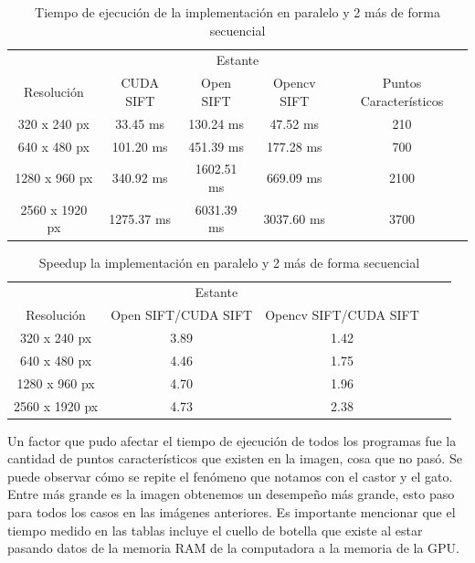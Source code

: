 \begin{table}[phtb]
\centering
\begin{tabular}{|c|c|c|c|c|}
\hline
\multicolumn{5}{|c|}{Estante} \\
\cline{1-5}
Resolución & CUDA SIFT & Open SIFT & Opencv SIFT & Puntos Característicos\\
\hline \hline
 320 x 240 px  & 33.45 ms   & 130.24 ms   & 47.52 ms   & 210\\ \cline{1-5}
 640 x 480 px  & 101.20 ms  &  451.39 ms  & 177.28 ms  & 700\\ \cline{1-5}
1280 x 960 px  & 340.92 ms  &  1602.51 ms & 669.09 ms  & 2100\\ \cline{1-5}
2560 x 1920 px & 1275.37 ms &  6031.39 ms & 3037.60 ms & 3700\\ \cline{1-5}
\end{tabular}
\caption{Tiempo de ejecución de la implementación en paralelo y 2 más de forma secuencial}
\label{tabla:final}
\end{table}
\begin{table}[phtb]
\centering
\begin{tabular}{|c|c|c|c|c|}
\hline
\multicolumn{3}{|c|}{Estante} \\
\cline{1-3}
Resolución & Open SIFT/CUDA SIFT & Opencv SIFT/CUDA SIFT \\
\hline \hline
 320 x 240 px  &  3.89  &  1.42   \\ \cline{1-3}
 640 x 480 px  &  4.46  &  1.75  \\ \cline{1-3}
1280 x 960 px  &  4.70  &  1.96  \\ \cline{1-3}
2560 x 1920 px &  4.73  &  2.38 \\ \cline{1-3}
\end{tabular}
\caption{Speedup la implementación en paralelo y 2 más de forma secuencial}
\label{tabla:final}
\end{table}
\pagebreak
Un factor que pudo afectar el tiempo de ejecución de todos los programas fue la cantidad de puntos característicos que existen en la imagen, cosa que no pasó. Se puede observar cómo se repite el fenómeno que notamos con el castor y el gato. Entre más grande es la imagen obtenemos un desempeño más grande, esto paso para todos los casos en las imágenes anteriores. Es importante mencionar que el tiempo medido en las tablas incluye el cuello de botella que existe al estar pasando datos de la memoria RAM de la computadora a la memoria de la GPU.
